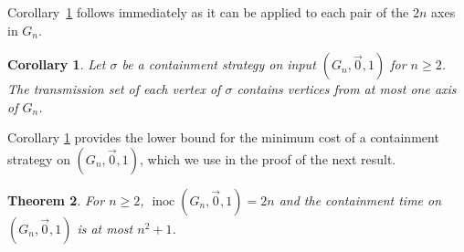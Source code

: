 \documentclass[unknownkeysallowed]{article}
\newtheorem{theorem}{Theorem}[section]
\newtheorem{corollary}[theorem]{Corollary}
\theoremstyle{definition}\newtheorem{strategy}{Strategy}
\theoremstyle{definition}\newtheorem{notation}{Notation}[theorem]
\DeclareMathOperator{\inoc}{inoc}
\begin{document}
Corollary~\ref{cor:axes} follows immediately as it can be applied to each pair of the $2n$ axes in $G_n$.  

\begin{corollary}\label{cor:axes} Let $\sigma$ be a containment strategy on input $(G_n,\vec{0},1)$ for $n \geq 2$.   The transmission set of each vertex of $\sigma$ contains vertices from at most one axis of $G_n$.  
\end{corollary}

Corollary \ref{cor:axes} provides the lower bound for the minimum cost of a containment strategy on $(G_n,\vec{0},1)$, which we use in the proof of the next result. 



\begin{theorem}\label{thm:uppercart} For $n \geq 2$, $\inoc(G_n,\vec{0},1)=2n$ and the containment time on $(G_n,\vec{0},1)$ is at most $n^2+1$. 
\end{theorem}
\end{document}
